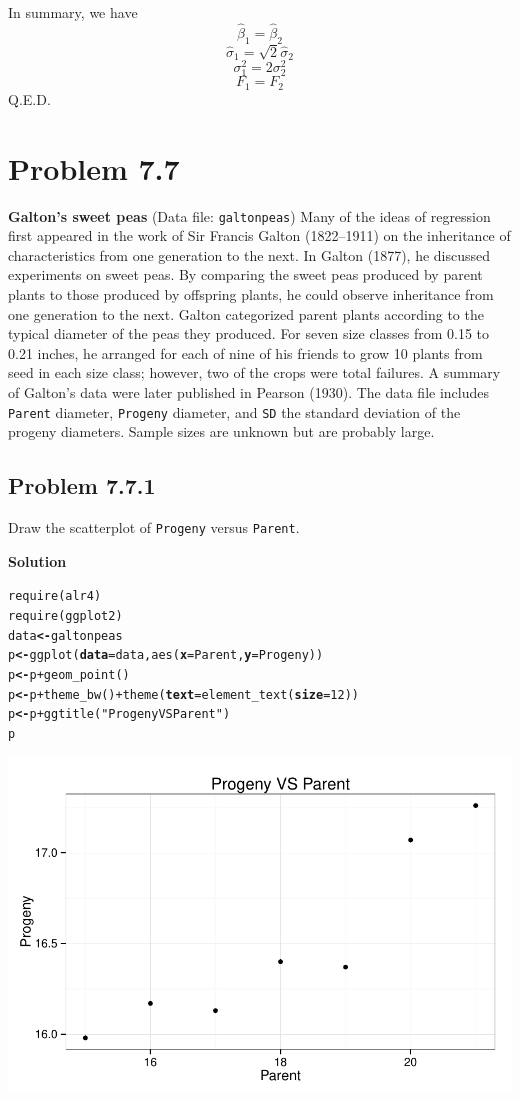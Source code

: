 \documentclass[12pt,oneside,a4paper]{article}\usepackage[]{graphicx}\usepackage[]{xcolor}
\makeatletter
\newcommand{\hlnum}[1]{\textcolor[rgb]{0,0,0}{#1}}%
\newcommand{\hlstr}[1]{\textcolor[rgb]{0,0,1}{#1}}%
\newcommand{\hlopt}[1]{\textcolor[rgb]{0,0,0}{#1}}%
\newcommand{\hlstd}[1]{\textcolor[rgb]{0,0,0}{#1}}%
\newcommand{\hlkwb}[1]{\textcolor[rgb]{0.498,0,0.333}{\textbf{#1}}}%
\newcommand{\hlkwc}[1]{\textcolor[rgb]{0.498,0,0.333}{\textbf{#1}}}%
\newcommand{\hlkwd}[1]{\textcolor[rgb]{0,0,0}{#1}}%
\newenvironment{kframe}{%
 \def\at@end@of@kframe{}%
 \ifinner\ifhmode%
  \def\at@end@of@kframe{\end{minipage}}%
  \begin{minipage}{\columnwidth}%
 \fi\fi%
 \def\FrameCommand##1{\hskip\@totalleftmargin \hskip-\fboxsep
 \colorbox{shadecolor}{##1}\hskip-\fboxsep
     \hskip-\linewidth \hskip-\@totalleftmargin \hskip\columnwidth}%
 \MakeFramed {\advance\hsize-\width
   \@totalleftmargin\z@ \linewidth\hsize
   \@setminipage}}%
 {\par\unskip\endMakeFramed%
 \at@end@of@kframe}
\newenvironment{knitrout}{}{} %
\newcommand{\problem}[1]
{
    \clearpage
    \section*{Problem {#1}}
}
\newcommand{\subproblem}[1]
{
    \subsection*{Problem {#1}}
}
\newcommand{\solution}
{
    \vspace{15pt}
    \noindent\ignorespaces\textbf{\large Solution}\par
}
\newcommand{\m}[1]{\texttt{{#1}}}
\makeatother
\begin{document}
In summary, we have
$$\hat{\beta}_{1} = \hat{\beta}_{2}$$
$$\hat{\sigma}_{1} = \sqrt{2}\hat{\sigma}_{2}$$
$$\sigma_{1}^{2} = 2\sigma_{2}^{2}$$
$$F_{1} = F_{2}$$
Q.E.D.

\problem{7.7}
\textbf{Galton’s sweet peas} (Data file: \m{galtonpeas}) Many of the ideas of regression first appeared in the work of Sir Francis Galton (1822–1911) on the inheritance of characteristics from one generation to the next. In Galton (1877), he discussed experiments on sweet peas. By comparing the sweet peas produced by parent plants to those produced by offspring plants, he could observe inheritance from one generation to the next. Galton categorized parent plants according to the typical diameter of the peas they produced. For seven size classes from 0.15 to 0.21 inches, he arranged for each of nine of his friends to grow 10 plants from seed in each size class; however, two of the crops were total failures. A summary of Galton’s data were later published in Pearson (1930). The data file includes \m{Parent} diameter, \m{Progeny} diameter, and \m{SD} the standard deviation of the progeny diameters. Sample sizes are unknown but are probably large.

\subproblem{7.7.1}
Draw the scatterplot of \m{Progeny} versus \m{Parent}.

\solution
\begin{knitrout}
\color{fgcolor}\begin{kframe}
\begin{alltt}
\hlkwd{require}\hlstd{(alr4)}
\hlkwd{require}\hlstd{(ggplot2)}
\hlstd{data} \hlkwb{<-} \hlstd{galtonpeas}
\hlstd{p} \hlkwb{<-} \hlkwd{ggplot}\hlstd{(}\hlkwc{data} \hlstd{= data,} \hlkwd{aes}\hlstd{(}\hlkwc{x} \hlstd{= Parent,} \hlkwc{y} \hlstd{= Progeny))}
\hlstd{p} \hlkwb{<-} \hlstd{p} \hlopt{+} \hlkwd{geom_point}\hlstd{()}
\hlstd{p} \hlkwb{<-} \hlstd{p} \hlopt{+} \hlkwd{theme_bw}\hlstd{()} \hlopt{+} \hlkwd{theme}\hlstd{(}\hlkwc{text} \hlstd{=} \hlkwd{element_text}\hlstd{(}\hlkwc{size} \hlstd{=} \hlnum{12}\hlstd{))}
\hlstd{p} \hlkwb{<-} \hlstd{p} \hlopt{+} \hlkwd{ggtitle}\hlstd{(}\hlstr{"Progeny VS Parent"}\hlstd{)}
\hlstd{p}
\end{alltt}
\end{kframe}

{\centering \includegraphics[width=.8\linewidth]{figure/p771} 

}



\end{knitrout}
\end{document}
